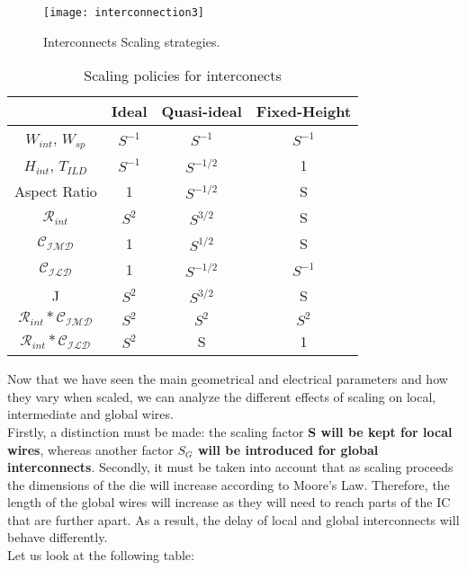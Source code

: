 \documentclass[a4paper, 12pt, twoside, openright]{report}
\begin{document}
	\begin{figure}[H]
	\centering
	\texttt{[image: interconnection3]}
	\caption{Interconnects Scaling strategies.}
	\label{figint2}
	\end{figure}

\begin{table}[H] {
\begin{center} {
\begin{tabular}{||c|c|c|c||}
\hline
&Ideal&Quasi-ideal&Fixed-Height\\
\hline
$W_{int}$, $W_{sp}$ & $S^{-1}$ & $S^{-1}$ & $S^{-1}$\\
\hline
$H_{int}$, $T_{ILD}$ & $S^{-1}$ & $S^{-1/2}$ & 1\\
\hline
Aspect Ratio & 1 & $S^{-1/2}$ & S\\
\hline
$\mathcal{R}_{int}$ & $S^{2}$ & $S^{3/2}$ & S\\
\hline
$\mathcal{C_{IMD}}$ & 1 & $S^{1/2}$ & S\\
\hline
$\mathcal{C_{ILD}}$ & 1 & $S^{-1/2}$ & $S^{-1}$\\
\hline
J & $S^{2}$ & $S^{3/2}$ & S\\
\hline
$\mathcal{R}_{int}*\mathcal{C_{IMD}}$ & $S^{2}$ & $S^{2}$ & $S^{2}$\\
\hline
$\mathcal{R}_{int}*\mathcal{C_{ILD}}$ & $S^{2}$ & S & 1\\
\hline
\end{tabular} }
\caption{Scaling policies for interconects}
\end{center} }
\end{table}

Now that we have seen the main geometrical and electrical parameters and how they vary when scaled, we can analyze the different effects of scaling on local, intermediate and global wires.\\ Firstly, a distinction must be made: the scaling factor \textbf{S will be kept for local wires}, whereas another factor \textbf{$S_{G}$ will be introduced for global interconnects}. Secondly, it must be taken into account that as scaling proceeds the dimensions of the die will increase according to Moore's Law. Therefore, the length of the global wires will increase as they will need to reach parts of the IC that are further apart. As a result, the delay of local and global interconnects will behave differently.\\ Let us look at the following table:
\end{document}
